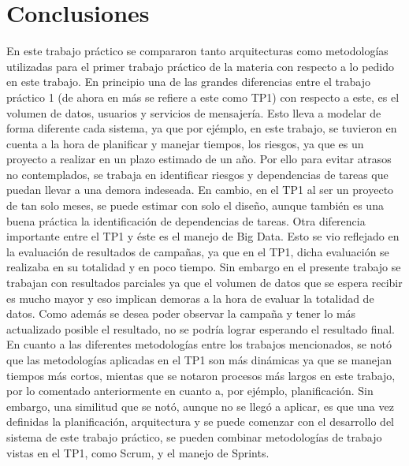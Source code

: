 \section{Conclusiones}

En este trabajo pr\'actico se compararon tanto arquitecturas como metodolog\'ias utilizadas para el primer trabajo pr\'actico de la materia con respecto a lo pedido en este trabajo.
En principio una de las grandes diferencias entre el trabajo pr\'actico 1 (de ahora en m\'as se refiere a este como TP1) con respecto a este, es el volumen de datos, usuarios y servicios de mensajer\'ia. Esto lleva a modelar de forma diferente cada sistema, ya que por ej\'emplo, en este trabajo, se tuvieron en cuenta a la hora de planificar y manejar tiempos, los riesgos, ya que es un proyecto a realizar en un plazo estimado de un a\~no. Por ello para evitar atrasos no contemplados, se trabaja en identificar riesgos y dependencias de tareas que puedan llevar a una demora indeseada. En cambio, en el TP1 al ser un proyecto de tan solo meses, se puede estimar con solo el dise\~no, aunque tambi\'en es una buena pr\'actica la identificaci\'on de dependencias de tareas.
Otra diferencia importante entre el TP1 y \'este es el manejo de Big Data. Esto se vio reflejado en la evaluaci\'on de resultados de campa\~nas, ya que en el TP1, dicha evaluaci\'on se realizaba en su totalidad y en poco tiempo. Sin embargo en el presente trabajo se trabajan con resultados parciales ya que el volumen de datos que se espera recibir es mucho mayor y eso implican demoras a la hora de evaluar la totalidad de datos. Como adem\'as se desea poder observar la campa\~na y tener lo m\'as actualizado posible el resultado, no se podr\'ia lograr esperando el resultado final.
En cuanto a las diferentes metodolog\'ias entre los trabajos mencionados, se not\'o que las metodolog\'ias aplicadas en el TP1 son m\'as din\'amicas ya que se manejan tiempos m\'as cortos, mientas que se notaron procesos m\'as largos en este trabajo, por lo comentado anteriormente en cuanto a, por ej\'emplo, planificaci\'on. Sin embargo, una similitud que se not\'o, aunque no se lleg\'o a aplicar, es que una vez definidas la planificaci\'on, arquitectura y se puede comenzar con el desarrollo del sistema de este trabajo pr\'actico, se pueden combinar metodolog\'ias de trabajo vistas en el TP1, como Scrum, y el manejo de Sprints.